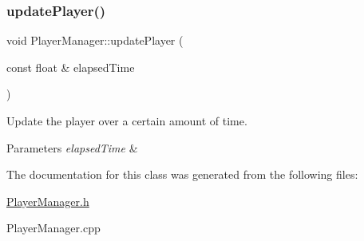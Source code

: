\subsubsection{\texorpdfstring{update\+Player()}{updatePlayer()}}
{\footnotesize\ttfamily void Player\+Manager\+::update\+Player (\begin{DoxyParamCaption}\item[{const float \&}]{elapsed\+Time }\end{DoxyParamCaption})}



Update the player over a certain amount of time. 


\begin{DoxyParams}{Parameters}
{\em elapsed\+Time} & \\
\hline
\end{DoxyParams}


The documentation for this class was generated from the following files\+:\begin{DoxyCompactItemize}
\item 
\hyperlink{_player_manager_8h}{Player\+Manager.\+h}\item 
Player\+Manager.\+cpp\end{DoxyCompactItemize}

